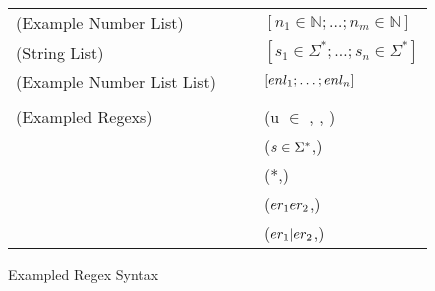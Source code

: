 \documentclass{article}
\begin{document}
\begin{figure}
\begin{tabular}{l@{\ }l@{\ }c@{\ }l}

(Example Number List)& \ExampleNumberList{} & \GEq{} & $[n_1 \in \mathbb{N};\ldots ;n_m \in \mathbb{N}]$ \\
(String List)& \StringList{} & \GEq{} & $[s_1 \in \Sigma^*;\ldots ;s_n \in \Sigma^*]$ \\
(Example Number List List)& \ExampleNumberListList{} & \GEq{} & $[enl_1;\ldots ;enl_n]$ \\
\\
(Exampled Regexs)& \ExampledRegex{} & \GEq{} & (u $\in$ \TypeContext{}, \StringList{}, \ExampleNumberListList{}) \\
& & & \GBar{} ($s \in \Sigma^*$,\ExampleNumberListList{}) \\
& & & \GBar{} (\ExampledRegex{}*,\ExampleNumberListList{}) \\
& & & \GBar{} ($er_1 er_2$,\ExampleNumberListList{}) \\
& & & \GBar{} ($er_1 | er_2$,\ExampleNumberListList{}) \\
\end{tabular}
\caption{Exampled Regex Syntax}
\label{fig:refn-subgrammars}
\end{figure}
\end{document}
